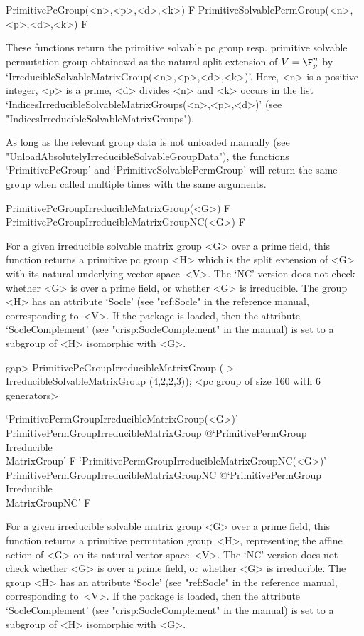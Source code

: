 \>PrimitivePcGroup(<n>,<p>,<d>,<k>) F
\>PrimitiveSolvablePermGroup(<n>,<p>,<d>,<k>) F

These functions return the primitive solvable pc group resp. primitive solvable 
permutation group obtainewd as the natural split extension of $V = \F_p^n$ by
`IrreducibleSolvableMatrixGroup(<n>,<p>,<d>,<k>)'. Here, <n> is a positive 
integer, <p> is a prime, <d> divides <n> and <k> occurs in the list 
`IndicesIrreducibleSolvableMatrixGroups(<n>,<p>,<d>)' 
(see "IndicesIrreducibleSolvableMatrixGroups").

As long as the relevant group data is not unloaded manually 
(see "UnloadAbsolutelyIrreducibleSolvableGroupData"), the functions `PrimitivePcGroup'
and `PrimitiveSolvablePermGroup' will return the same group when called multiple times
with the same arguments.


\>PrimitivePcGroupIrreducibleMatrixGroup(<G>) F
\>PrimitivePcGroupIrreducibleMatrixGroupNC(<G>) F

For a given irreducible solvable matrix group <G> over a prime field, this function
returns a primitive pc group <H> which is the split extension of <G> with its natural
underlying vector space~<V>. The `NC' version does not check whether <G> is over a prime field, 
or whether <G> is irreducible. The group <H> has an attribute `Socle' (see "ref:Socle" 
in the {\GAP} reference manual, corresponding to~<V>. If the package {\CRISP} is loaded, 
then the attribute `SocleComplement' (see "crisp:SocleComplement" in the {\CRISP} manual) is set to a subgroup of 
<H> isomorphic with <G>.

\beginexample
gap> PrimitivePcGroupIrreducibleMatrixGroup (
>       IrreducibleSolvableMatrixGroup (4,2,2,3));
<pc group of size 160 with 6 generators>
\endexample

\>`PrimitivePermGroupIrreducibleMatrixGroup(<G>)'%
{PrimitivePermGroupIrreducibleMatrixGroup}%
@{`PrimitivePermGroup\\Irreducible\\MatrixGroup'} F
\>`PrimitivePermGroupIrreducibleMatrixGroupNC(<G>)'%
{PrimitivePermGroupIrreducibleMatrixGroupNC}%
@{`PrimitivePermGroup\\Irreducible\\MatrixGroupNC'} F

For a given irreducible solvable matrix group <G> over a prime field, this function
returns a primitive permutation group~<H>, representing the affine action of <G> on its natural
vector space~<V>. The `NC' version does not check whether <G> is over a prime field, 
or whether <G> is irreducible. The group <H> has an attribute `Socle' (see "ref:Socle" 
in the {\GAP} reference manual, corresponding to~<V>. If the package {\CRISP} is loaded, 
then the attribute `SocleComplement' (see "crisp:SocleComplement" in the {\CRISP} manual) is set to a subgroup of 
<H> isomorphic with <G>.

